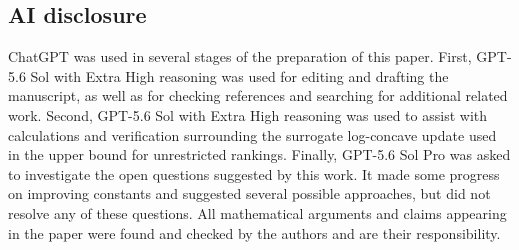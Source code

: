 \documentclass[11pt]{article}
\theoremstyle{definition}
\theoremstyle{remark}
\begin{document}


\subsection*{AI disclosure}
ChatGPT was used in several stages of the preparation of this paper.
First, GPT-5.6 Sol with Extra High reasoning was used for
editing and drafting the manuscript, as well as for checking references
and searching for additional related work. Second, GPT-5.6 Sol with Extra
High reasoning was used to assist with calculations and verification
surrounding the surrogate log-concave update used in the upper bound for
unrestricted rankings. Finally, GPT-5.6 Sol Pro was asked to investigate
the open questions suggested by this work. It made some progress on
improving constants and suggested several possible approaches, but did not
resolve any of these questions. All mathematical arguments and claims
appearing in the paper were found and checked by the authors and are their responsibility.



\end{document}
